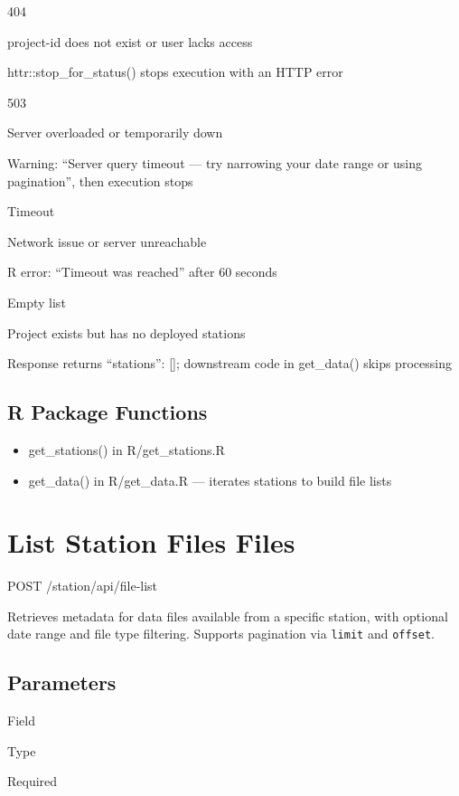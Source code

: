\documentclass[
]{book}
\providecommand{\tightlist}{%
  \setlength{\itemsep}{0pt}\setlength{\parskip}{0pt}}
\begin{document}
{404}

project-id does not exist or user lacks access

httr::stop\_for\_status() stops execution with an HTTP error

{503}

Server overloaded or temporarily down

Warning: ``Server query timeout --- try narrowing your date range or using pagination'', then execution stops

{Timeout}

Network issue or server unreachable

R error: ``Timeout was reached'' after 60 seconds

{Empty list}

Project exists but has no deployed stations

Response returns ``stations'': {[}{]}; downstream code in get\_data() skips processing

\subsection{R Package Functions}\label{r-package-functions-1}

\begin{itemize}
\tightlist
\item
  get\_stations() in R/get\_stations.R
\item
  get\_data() in R/get\_data.R --- iterates stations to build file lists
\end{itemize}

\section{\texorpdfstring{List Station Files {Files}}{List Station Files Files}}\label{list-station-files-files}

{POST}
{/station/api/file-list}

Retrieves metadata for data files available from a specific station, with optional date range and file type filtering. Supports pagination via \texttt{limit} and \texttt{offset}.

\subsection{Parameters}\label{parameters-2}

Field

Type

Required
\end{document}
